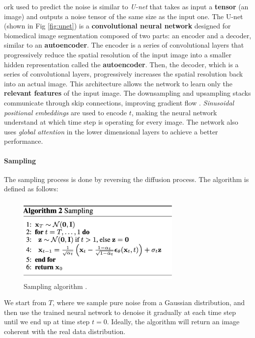 \documentclass[preprint]{elsarticle}
\begin{document}
ork used to predict the noise is similar to \emph{U-net} \cite{ronneberger2015unet} that takes as input a 
\textbf{tensor} (an image) and outputs a noise tensor
of the same size as the input one.
The U-net (shown in Fig \ref{fig:unet}) is a \textbf{convolutional neural network} designed for biomedical image segmentation
composed of two parts: an encoder and a decoder, similar to an \textbf{autoencoder}.
The encoder is a series of convolutional layers that progressively reduce the spatial resolution of the input image 
into a smaller hidden representation called the \textbf{autoencoder}.
Then, the decoder, which is a series of convolutional layers, progressively increases the spatial resolution back into an actual image.
This architecture allows the network to learn only the \textbf{relevant features} of the input image.
The downsampling and upsampling stacks communicate through skip connections, improving gradient flow \cite{he2015deep}.
\emph{Sinusoidal positional embeddings} are used to encode $t$, 
making the neural network understand at which time step is operating for every image.
The network also uses \emph{global attention} in the lower dimensional layers to achieve a better performance.

\paragraph{Sampling}
The sampling process is done by reversing the diffusion process. The algorithm is defined as follows:

\begin{figure}[H]
	\centering
	\includegraphics[width=8cm, keepaspectratio]{img/background_img/DDPM-sampling.png}
	\caption{Sampling algorithm \cite{weng2021diffusion}.}
\end{figure}


We start from $T$, where we sample pure noise from a Gaussian distribution, 
and then use the trained neural network to denoise it gradually at each time step until we end up at time step $t=0$.
Ideally, the algorithm will return an image coherent with the real data distribution.
\end{document}
